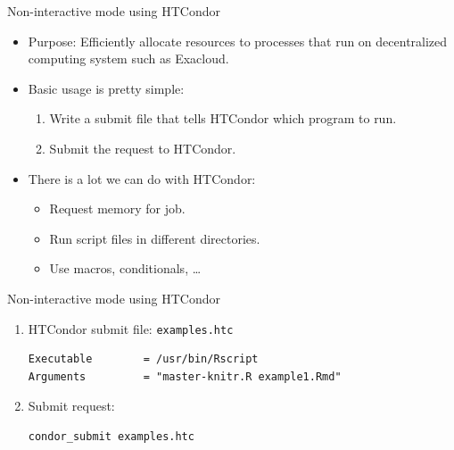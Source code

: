 \documentclass[12pt,t,xcolor=table]{beamer}
\begin{document}
\begin{frame}[label={sec:orgheadline15}]{Non-interactive mode using HTCondor}
\begin{itemize}
\item Purpose: Efficiently allocate resources to processes that run on decentralized computing system such as Exacloud.

\item Basic usage is pretty simple: 

\begin{enumerate}
\item Write a submit file that tells HTCondor which program to run.

\item Submit the request to HTCondor.
\end{enumerate}

\item There is \alert{a lot} we can do with HTCondor:

\begin{itemize}
\item Request memory for job.

\item Run script files in different directories.

\item Use macros, conditionals, \ldots{}
\end{itemize}
\end{itemize}
\end{frame}

\begin{frame}[fragile,label={sec:orgheadline16}]{Non-interactive mode using HTCondor}
 \begin{enumerate}
\item HTCondor submit file: \texttt{examples.htc}

\begin{verbatim}
Executable        = /usr/bin/Rscript
Arguments         = "master-knitr.R example1.Rmd"
\end{verbatim}

\item Submit request:

\begin{verbatim}
condor_submit examples.htc
\end{verbatim}
\end{enumerate}
\end{frame}
\end{document}
